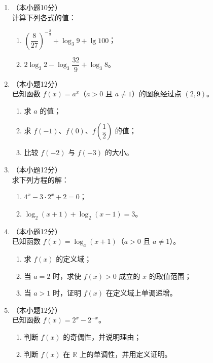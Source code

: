 \documentclass[12pt, a4paper]{ctexart}
\begin{document}
\begin{enumerate}[resume]
\item[17.]（本小题10分）\\
计算下列各式的值：
\begin{enumerate}[(1)]
  \item $\left(\dfrac{8}{27}\right)^{-\frac{2}{3}}+\log_3 9+\lg 100$；
  \item $2\log_3 2-\log_3 \dfrac{32}{9}+\log_3 8$。
\end{enumerate}

\vspace{6cm}

\item[18.]（本小题12分）\\
已知函数 $f(x)=a^x$（$a>0$ 且 $a\neq 1$）的图象经过点 $(2,9)$。
\begin{enumerate}[(1)]
  \item 求 $a$ 的值；
  \item 求 $f(-1)$、$f(0)$、$f\!\left(\dfrac{1}{2}\right)$ 的值；
  \item 比较 $f(-2)$ 与 $f(-3)$ 的大小。
\end{enumerate}

\vspace{6cm}

\item[19.]（本小题12分）\\
求下列方程的解：
\begin{enumerate}[(1)]
  \item $4^x-3\cdot 2^x+2=0$；
  \item $\log_2(x+1)+\log_2(x-1)=3$。
\end{enumerate}

\vspace{6cm}

\item[20.]（本小题12分）\\
已知函数 $f(x)=\log_a(x+1)$（$a>0$ 且 $a\neq 1$）。
\begin{enumerate}[(1)]
  \item 求 $f(x)$ 的定义域；
  \item 当 $a=2$ 时，求使 $f(x)>0$ 成立的 $x$ 的取值范围；
  \item 当 $a>1$ 时，证明 $f(x)$ 在定义域上单调递增。
\end{enumerate}

\vspace{6cm}

\item[21.]（本小题12分）\\
已知函数 $f(x)=2^x-2^{-x}$。
\begin{enumerate}[(1)]
  \item 判断 $f(x)$ 的奇偶性，并说明理由；
  \item 判断 $f(x)$ 在 $\mathbb{R}$ 上的单调性，并用定义证明。
\end{enumerate}


\end{enumerate}
\end{document}
